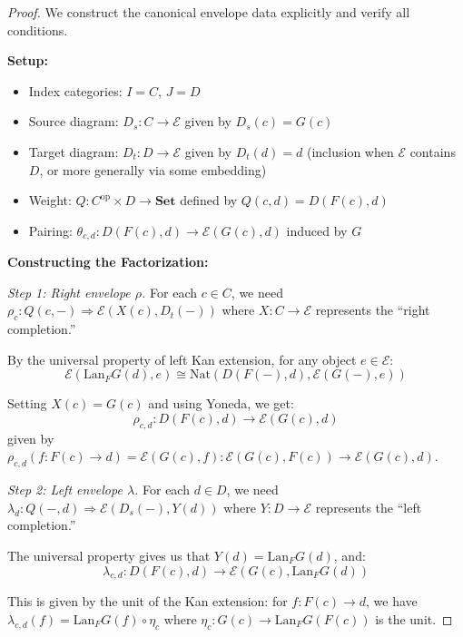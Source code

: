 \documentclass[11pt]{article}
\theoremstyle{plain}
\theoremstyle{definition}
\theoremstyle{remark}
\begin{document}
\begin{proof}
We construct the canonical envelope data explicitly and verify all conditions.

\textbf{Setup:}
\begin{itemize}
\item Index categories: $I = C$, $J = D$
\item Source diagram: $D_s : C \to \mathcal{E}$ given by $D_s(c) = G(c)$
\item Target diagram: $D_t : D \to \mathcal{E}$ given by $D_t(d) = d$ (inclusion when $\mathcal{E}$ contains $D$, or more generally via some embedding)
\item Weight: $Q : C^{\mathrm{op}} \times D \to \mathbf{Set}$ defined by $Q(c,d) = D(F(c), d)$
\item Pairing: $\theta_{c,d} : D(F(c), d) \to \mathcal{E}(G(c), d)$ induced by $G$
\end{itemize}

\textbf{Constructing the Factorization:}

\emph{Step 1: Right envelope $\rho$.} For each $c \in C$, we need $\rho_c : Q(c, -) \Rightarrow \mathcal{E}(X(c), D_t(-))$ where $X : C \to \mathcal{E}$ represents the ``right completion.''

By the universal property of left Kan extension, for any object $e \in \mathcal{E}$:
\begin{equation}
\mathcal{E}(\mathrm{Lan}_F G(d), e) \cong \mathrm{Nat}(D(F(-), d), \mathcal{E}(G(-), e))
\end{equation}

Setting $X(c) = G(c)$ and using Yoneda, we get:
\begin{equation}
\rho_{c,d} : D(F(c), d) \to \mathcal{E}(G(c), d)
\end{equation}
given by $\rho_{c,d}(f : F(c) \to d) = \mathcal{E}(G(c), f) : \mathcal{E}(G(c), F(c)) \to \mathcal{E}(G(c), d)$.

\emph{Step 2: Left envelope $\lambda$.} For each $d \in D$, we need $\lambda_d : Q(-, d) \Rightarrow \mathcal{E}(D_s(-), Y(d))$ where $Y : D \to \mathcal{E}$ represents the ``left completion.''

The universal property gives us that $Y(d) = \mathrm{Lan}_F G(d)$, and:
\begin{equation}
\lambda_{c,d} : D(F(c), d) \to \mathcal{E}(G(c), \mathrm{Lan}_F G(d))
\end{equation}

This is given by the unit of the Kan extension: for $f : F(c) \to d$, we have $\lambda_{c,d}(f) = \mathrm{Lan}_F G(f) \circ \eta_c$ where $\eta_c : G(c) \to \mathrm{Lan}_F G(F(c))$ is the unit.


\end{proof}
\end{document}
